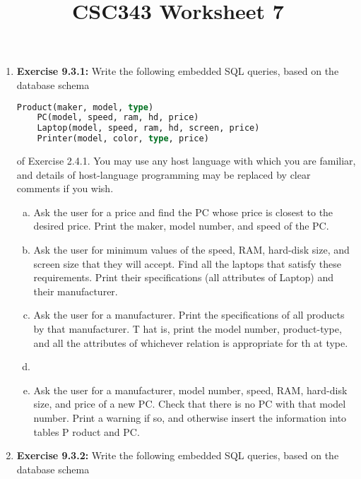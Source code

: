 \documentclass[12pt]{article}
\begin{document}
\title{CSC343 Worksheet 7}
\maketitle

\begin{enumerate}[1.]
    \item \textbf{Exercise 9.3.1:} Write the following embedded SQL queries, based on the
    database schema

    \bigskip

    \begin{lstlisting}[language=SQL]
    Product(maker, model, type)
    PC(model, speed, ram, hd, price)
    Laptop(model, speed, ram, hd, screen, price)
    Printer(model, color, type, price)
    \end{lstlisting}

    \bigskip

    of Exercise 2.4.1. You may use any host language with which you are familiar,
    and details of host-language programming may be replaced by clear comments
    if you wish.

    \bigskip

    \begin{enumerate}[a)]
    \item Ask the user for a price and find the PC whose price is closest to the desired price. Print the maker, model number, and speed of the PC.
    \item Ask the user for minimum values of the speed, RAM, hard-disk size, and screen size that they will accept. Find all the laptops that satisfy these requirements. Print their specifications (all attributes of Laptop) and their manufacturer.
    \item Ask the user for a manufacturer. Print the specifications of all products by that manufacturer. T hat is, print the model number, product-type, and all the attributes of whichever relation is appropriate for th at type.
    \item
    \item Ask the user for a manufacturer, model number, speed, RAM, hard-disk size, and price of a new PC. Check that there is no PC with that model number. Print a warning if so, and otherwise insert the information into tables P roduct and PC.
    \end{enumerate}

    \bigskip

    \item \textbf{Exercise 9.3.2:} Write the following embedded SQL queries, based on the
    database schema


\end{enumerate}
\end{document}
